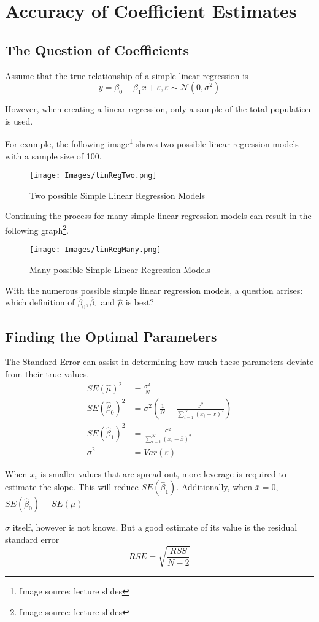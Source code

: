 \clearpage
\section{Accuracy of Coefficient Estimates}
\subsection{The Question of Coefficients}
Assume that the true relationship of a simple linear regression is
\[y=\beta_0+\beta_1x+\varepsilon,\varepsilon\sim\mathcal{N}(0,\sigma^2)\]

However, when creating a linear regression, only a sample of the total population is used.

For example, the following image\footnote{Image source: lecture slides} shows two possible linear regression models with a sample size of 100.
\begin{figure}[!ht]
    \centering
    \texttt{[image: Images/linRegTwo.png]}
    \caption{Two possible Simple Linear Regression Models}
\end{figure}

Continuing the process for many simple linear regression models can result in the following graph\footnote{Image source: lecture slides}.
\begin{figure}[!ht]
    \centering
    \texttt{[image: Images/linRegMany.png]}
    \caption{Many possible Simple Linear Regression Models}
\end{figure}

With the numerous possible simple linear regression models, a question arrises: which definition of $\hat{\beta}_0,\hat{\beta}_1$ and $\hat{\mu}$ is best?

\subsection{Finding the Optimal Parameters}
The Standard Error can assist in determining how much these parameters deviate from their true values.
\begin{align*}
SE\left(\hat{\mu}\right)^2      &= \frac{\sigma^2}{N} \\
SE\left(\hat{\beta}_0\right)^2  &= \sigma^2\left(\frac{1}{N}+\frac{x^2}{\sum_{i=1}^{N}(x_i-\bar{x})^2}\right) \\
SE\left(\hat{\beta}_1\right)^2  &=\frac{\sigma^2}{\sum_{i=1}^{N}(x_i-\bar{x})^2} \\
\sigma^2    &= Var(\varepsilon)
\end{align*}

When $x_i$ is smaller values that are spread out, more leverage is required to estimate the slope. This will reduce $SE\left(\hat{\beta}_1\right)$.
Additionally, when $\bar{x}=0$, $SE\left(\hat{\beta}_0\right)=SE\left(\bar{\mu}\right)$

$\sigma$ itself, however is not knows. But a good estimate of its value is the residual standard error
\[RSE=\sqrt{\frac{RSS}{N-2}}\]